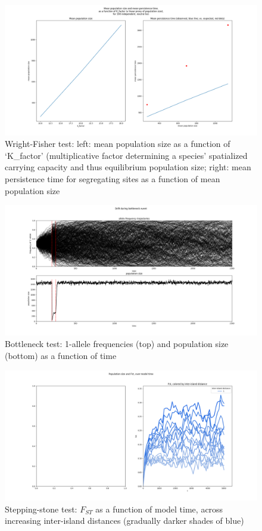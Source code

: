 ﻿\documentclass{article}
\begin{document}
\begin{figure}[h!]
\includegraphics[width=175mm]{./img/validation/wf/pop_size_vs_K_factor_and_mean_persist_t_vs_pop_size.png}
        \caption{Wright-Fisher test: left: mean population size as a function of `K\_factor' (multiplicative factor determining a species' spatialized carrying capacity and thus equilibrium population size; right: mean persistence time for segregating sites as a function of mean population size}
\end{figure}


\begin{figure}[h!]
\includegraphics[width=175mm]{./img/validation/bottleneck/alleles_seem_to_take_too_long_to_fix.png}
        \caption{Bottleneck test: 1-allele frequencies (top) and population size (bottom) as a function of time}
\end{figure}


\begin{figure}[h!]
\includegraphics[width=175mm]{./img/validation/stepping_stone/Fst_over_time_vs_interisland_dist.png}
        \caption{Stepping-stone test: $F_{ST}$ as a function of model time, across increasing inter-island distances (gradually darker shades of blue)}
\end{figure}
\end{document}
